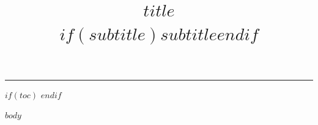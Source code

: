 \documentclass[11pt, a4paper]{article}
\author{}
\title{%
    \vspace{-1.5em}%
    \sffamily\bfseries\Large\textcolor{itgreen}{$title$}\\[4pt]
    \normalfont\normalsize\textcolor{degray}{$if(subtitle)$$subtitle$$endif$}%
  }
\title{}
\begin{document}
\maketitle
\vspace{-1em}
{\color{rulegray}\rule{\linewidth}{0.8pt}}
\vspace{0.5em}
\thispagestyle{fancy}

$if(toc)$
\tableofcontents
\clearpage
$endif$

$body$
\end{document}
